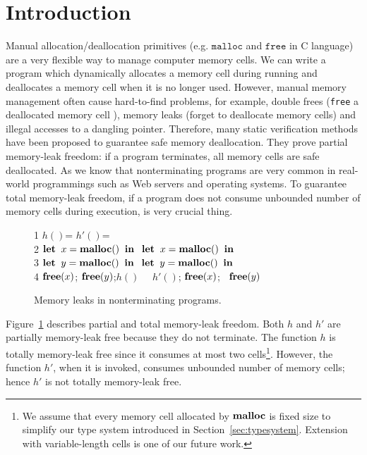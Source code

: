 \section{Introduction}
\label{sec:introduction}
Manual allocation/deallocation primitives (e.g. \(\texttt{malloc}\)
and \(\texttt{free}\) in C language) are a very flexible way to manage
computer memory cells.  We can write a program which dynamically
allocates a memory cell during running and deallocates a memory cell
when it is no longer used. However, manual memory management often
cause hard-to-find problems, for example, double frees (\texttt{free}
a deallocated memory cell ), memory leaks (forget to deallocate memory
cells) and illegal accesses to a dangling pointer. Therefore, many
static verification methods have been proposed to guarantee safe
memory deallocation. They prove partial memory-leak freedom: if a
program terminates, all memory cells are safe deallocated. As we know
that nonterminating programs are very common in real-world
programmings such as Web servers and operating systems. To guarantee
total memory-leak freedom, if a program does not consume unbounded
number of memory cells during execution, is very crucial thing.

\begin{exmp}\label{ex:ex1}
\begin{figure}[h]
1  \Rtab $h()$= \dtb \dtb\dtb\Rtab$h'()$= \\
2  \dtb $\mathbf{let}\; \; x = \mathbf{malloc()}\;  \; \mathbf{in}\;$ \dtb \Rtab$\mathbf{let}\; \; x = \mathbf{malloc()}\;  \; \mathbf{in}\;$\\
3  \dtb $\mathbf{let}\; \; y = \mathbf{malloc()}\;  \; \mathbf{in}\;$ \dtb \Rtab$\mathbf{let}\; \; y = \mathbf{malloc()}\;  \; \mathbf{in}\;$\\
4  \dtb $\mathbf{free}(x)$; $\mathbf{free}(y) $;\;$h()$ \dtb \Rtab\ \ $h'()$; $\mathbf{free}(x)$; \ $\mathbf{free}(y)$
\caption{Memory leaks in nonterminating programs.}
\label{ex:np}
\end{figure}
Figure~\ref{ex:np} describes partial and total memory-leak freedom.
Both \(h\) and \(h'\) are partially memory-leak free because they do
not terminate.  The function \(h\) is totally memory-leak free since
it consumes at most two cells\footnote{We assume that every memory
  cell allocated by \(\mathbf{malloc}\) is fixed size to simplify our type
  system introduced in Section~\ref{sec:typesystem}.  Extension with
  variable-length cells is one of our future work.}.  However, the
function \(h'\), when it is invoked, consumes unbounded number of
memory cells; hence \(h'\) is not totally memory-leak free.
\end{exmp}

